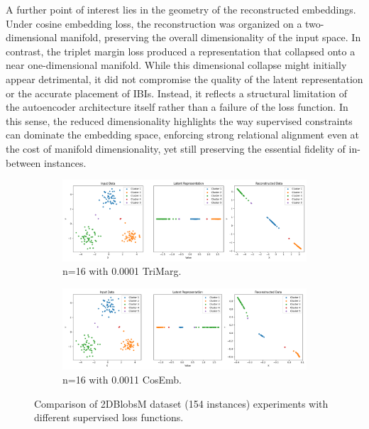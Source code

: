 A further point of interest lies in the geometry of the reconstructed embeddings. Under cosine embedding loss, the reconstruction was organized on a two-dimensional manifold, preserving the overall dimensionality of the input space. In contrast, the triplet margin loss produced a representation that collapsed onto a near one-dimensional manifold. While this dimensional collapse might initially appear detrimental, it did not compromise the quality of the latent representation or the accurate placement of IBIs. Instead, it reflects a structural limitation of the autoencoder architecture itself rather than a failure of the loss function. In this sense, the reduced dimensionality highlights the way supervised constraints can dominate the embedding space, enforcing strong relational alignment even at the cost of manifold dimensionality, yet still preserving the essential fidelity of in-between instances.

\begin{figure}[htbp]
  \centering
  \begin{subfigure}[b]{1.0\textwidth}
    \centering
    \includegraphics[width=\linewidth]{images/RQ3/tri/2DBlobsM_16_0.0001.png}
    \caption{n=16 with 0.0001 TriMarg.}
    \label{fig:RQ3/tri/2DBlobsM}
  \end{subfigure}
  \hfill
  \begin{subfigure}[b]{1.0\textwidth}
    \centering
    \includegraphics[width=\linewidth]{images/RQ3/cos/2DBlobsM_16_0.0011.png}
    \caption{n=16 with 0.0011 CosEmb.}
    \label{fig:RQ3/cos/2DBlobsM}
  \end{subfigure} 

  \caption{Comparison of 2DBlobsM dataset (154 instances) experiments with different
supervised loss functions.}
  \label{fig:RQ3/2DBlobsM}
\end{figure}

